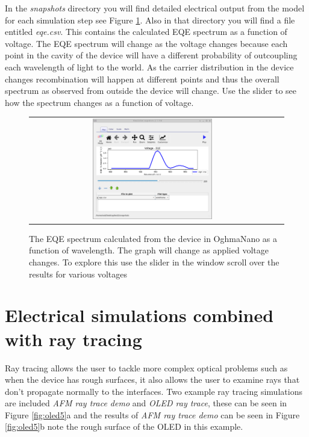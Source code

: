 In the \emph{snapshots} directory you will find detailed electrical output from the model for each simulation step see Figure \ref{fig:oled4}. Also in that directory you will find a file entitled \emph{eqe.csv}. This contains the calculated EQE spectrum as a function of voltage. The EQE spectrum will change as the voltage changes because each point in the cavity of the device will have a different probability of outcoupling each wavelength of light to the world. As the carrier distribution in the device changes recombination will happen at different points  and thus the overall spectrum as observed from outside the device will change. Use the slider to see how the spectrum changes as a function of voltage.

\begin{figure}[H]
\centering
\begin{tabular}{ c c }

\includegraphics[width=0.5\textwidth,height=0.4\textwidth]{./images/oled/wavelength_eqe.png}

\\
\end{tabular}
\caption{The EQE spectrum calculated from the device in OghmaNano as a function of wavelength. The graph will change as applied voltage changes. To explore this use the slider in the window scroll over the results for various voltages}
\label{fig:oled4}
\end{figure}


\newpage
\section{Electrical simulations combined with ray tracing}

Ray tracing allows the user to tackle more complex optical problems such as when the device has rough surfaces, it also allows the user to examine rays that don't propagate normally to the interfaces. Two example ray tracing simulations are included \emph{AFM ray trace demo} and \emph{OLED ray trace}, these can be seen in Figure \ref{fig:oled5}a and the results of  \emph{AFM ray trace demo} can be seen in Figure \ref{fig:oled5}b note the rough surface of the OLED in this example.

